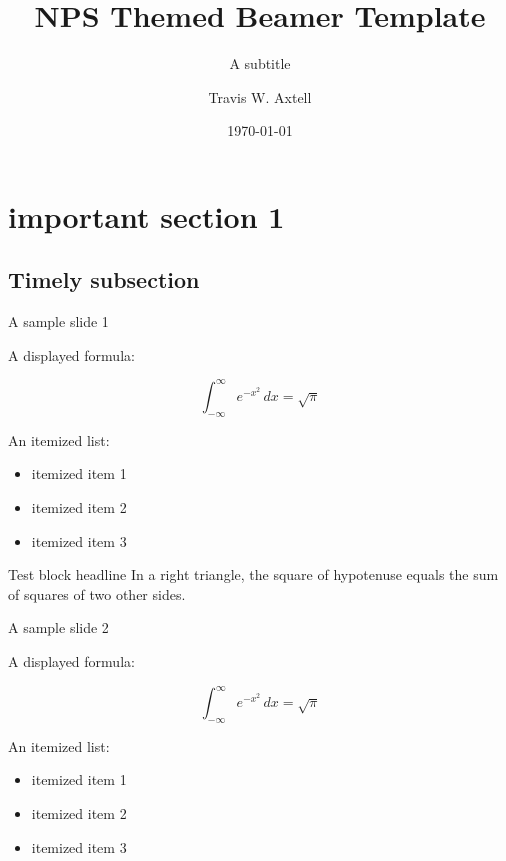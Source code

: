 \documentclass[final,serif,hyperref={pdfpagelabels=false}]{beamer}
\title[Short Title]{NPS Themed Beamer Template}
\subtitle[Short subtitle]{A subtitle}
\author[T. Axtell]{Travis W. Axtell}
\institute[NPS]{Department of Electrical and Computer Engineering\\
Monterey, CA 93943}
\date[\today]{\today}
\begin{document}





\section{important section 1}

{


\subsection{Timely subsection}

\begin{frame}{A sample slide 1}

A displayed formula:

\[
  \int_{-\infty}^\infty e^{-x^2} \, dx = \sqrt{\pi}
\]

An itemized list:

\begin{itemize}
  \item itemized item 1
  \item itemized item 2
  \item itemized item 3
\end{itemize}

\begin{block}{Test block headline}
  In a right triangle, the square of hypotenuse equals
  the sum of squares of two other sides.
\end{block}

\end{frame}


\begin{frame}{A sample slide 2}

A displayed formula:

\[
  \int_{-\infty}^\infty e^{-x^2} \, dx = \sqrt{\pi}
\]

An itemized list:

\begin{itemize}
  \item itemized item 1
  \item itemized item 2
  \item itemized item 3
\end{itemize}


\end{frame}}
\end{document}
